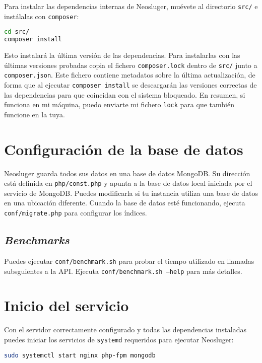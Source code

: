 Para instalar las dependencias internas de Neosluger, muévete al directorio \texttt{src/} e instálalas con \texttt{composer}:

\begin{lstlisting}[language=sh]
cd src/
composer install
\end{lstlisting}

Esto instalará la última versión de las dependencias.
Para instalarlas con las últimas versiones probadas copia el fichero \texttt{composer.lock} dentro de \texttt{src/} junto a \texttt{composer.json}.
Este fichero contiene metadatos sobre la última actualización, de forma que al ejecutar \texttt{composer install} se descargarán las versiones correctas de las dependencias para que coincidan con el sistema bloqueado.
En resumen, si funciona en mi máquina, puedo enviarte mi fichero \texttt{lock} para que también funcione en la tuya.

\section{Configuración de la base de datos}\label{configuración-de-la-base-de-datos}

Neosluger guarda todos sus datos en una base de datos MongoDB.
Su dirección está definida en \texttt{php/const.php} y apunta a la base de datos local iniciada por el servicio de MongoDB.
Puedes modificarla si tu instancia utiliza una base de datos en una ubicación diferente.
Cuando la base de datos esté funcionando, ejecuta \texttt{conf/migrate.php} para configurar los índices.

\subsection{\textit{Benchmarks}}\label{benchmarks}

Puedes ejecutar \texttt{conf/benchmark.sh} para probar el tiempo utilizado en llamadas subsguientes a la API.
Ejecuta \texttt{conf/benchmark.sh --help} para más detalles.

\section{Inicio del servicio}\label{inicio-del-servicio}

Con el servidor correctamente configurado y todas las dependencias instaladas puedes iniciar los servicios de \texttt{systemd} requeridos para ejecutar Neosluger:

\begin{lstlisting}[language=sh]
sudo systemctl start nginx php-fpm mongodb
\end{lstlisting}

